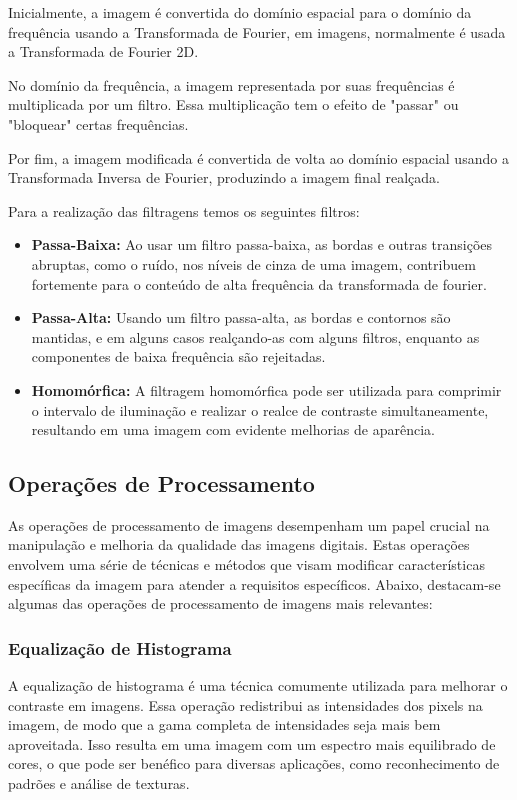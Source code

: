 \documentclass[conference]{IEEEtran}
\begin{document}
Inicialmente, a imagem é convertida do domínio espacial para o domínio da frequência usando a 
Transformada de Fourier, em imagens, normalmente é usada a Transformada de Fourier 2D.

No domínio da frequência, a imagem representada por suas frequências é multiplicada por um filtro. 
Essa multiplicação tem o efeito de "passar" ou "bloquear" certas frequências.

Por fim, a imagem modificada é convertida de volta ao domínio espacial usando a Transformada Inversa de Fourier, 
produzindo a imagem final realçada.

Para a realização das filtragens temos os seguintes filtros:
\begin{itemize}
    \item {\textbf{Passa-Baixa:}}
    Ao usar um filtro passa-baixa, as bordas e outras transições abruptas, como o ruído, nos níveis de cinza de uma 
    imagem, contribuem fortemente para o conteúdo de alta frequência da transformada de fourier.
    
    \item {\textbf{Passa-Alta:}}
    Usando um filtro passa-alta, as bordas e contornos são mantidas, e em alguns casos realçando-as com alguns 
    filtros, enquanto as componentes de baixa frequência são rejeitadas.
    
    \item {\textbf{Homomórfica:}}
    A filtragem homomórfica pode ser utilizada para comprimir o intervalo de iluminação e realizar o realce de 
    contraste simultaneamente, resultando em uma imagem com evidente melhorias de aparência.
\end{itemize}

\subsection{Operações de Processamento}
As operações de processamento de imagens desempenham um papel crucial na manipulação e melhoria 
da qualidade das imagens digitais. Estas operações envolvem uma série de técnicas e métodos que 
visam modificar características específicas da imagem para atender a requisitos específicos. 
Abaixo, destacam-se algumas das operações de processamento de imagens mais relevantes:

\subsubsection{Equalização de Histograma}
A equalização de histograma é uma técnica comumente utilizada para melhorar o contraste em imagens. 
Essa operação redistribui as intensidades dos pixels na imagem, de modo que a gama completa de 
intensidades seja mais bem aproveitada. Isso resulta em uma imagem com um espectro 
mais equilibrado de cores, o que pode ser benéfico para diversas aplicações, como reconhecimento 
de padrões e análise de texturas.
\end{document}
